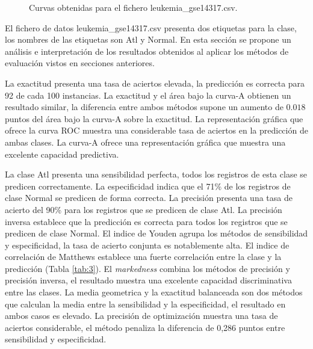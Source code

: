 \bigbreak

\begin{figure}[htp]
    \centering
    \caption{Curvas obtenidas para el fichero leukemia\_gse14317.csv.}
    \label{fig:15}
\end{figure}

\bigbreak

El fichero de datos leukemia\_gse14317.csv presenta dos etiquetas para la clase, los nombres de las etiquetas son Atl y Normal. En esta sección se propone un análisis e interpretación de los resultados obtenidos al aplicar los métodos de evaluación vistos en secciones anteriores.

\bigbreak

La exactitud presenta una tasa de aciertos elevada, la predicción es correcta para 92 de cada 100 instancias. La exactitud y el área bajo la curva-A obtienen un resultado similar, la diferencia entre ambos métodos supone un aumento de $0.018$ puntos del área bajo la curva-A sobre la exactitud. La representación gráfica que ofrece la curva ROC muestra una considerable tasa de aciertos en la predicción de ambas clases. La curva-A ofrece una representación gráfica que muestra una excelente capacidad predictiva.

\bigbreak

La clase Atl presenta una sensibilidad perfecta, todos los registros de esta clase se predicen correctamente. La especificidad indica que el 71\% de los registros de clase Normal se predicen de forma correcta. La precisión presenta una tasa de acierto del 90\% para los registros que se predicen de clase Atl. La precisión inversa establece que la predicción es correcta para todos los registros que se predicen de clase Normal. El indice de Youden agrupa los métodos de sensibilidad y especificidad, la tasa de acierto conjunta es notablemente alta. El indice de correlación de Matthews establece una fuerte correlación entre la clase y la predicción (Tabla \ref{tab:3}). El \textit{markedness} combina los métodos de precisión y precisión inversa, el resultado muestra una excelente capacidad discriminativa entre las clases. La media geometrica y la exactitud balanceada son dos métodos que calculan la media entre la sensibilidad y la especificidad, el resultado en ambos casos es elevado. La precisión de optimización muestra una tasa de aciertos considerable, el método penaliza la diferencia de 0,286 puntos entre sensibilidad y especificidad.

